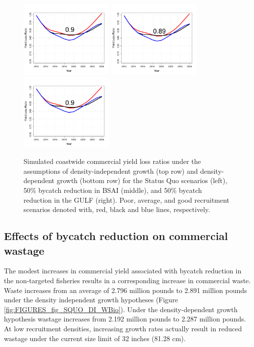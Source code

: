 \begin{figure}[htbp]
		\includegraphics[height=1.5in]{../FIGURES/YLR/fig_SQUO_DD_ylr.pdf}
		\includegraphics[height=1.5in]{../FIGURES/YLR/fig_BSAI_DD_ylr.pdf}
		\includegraphics[height=1.5in]{../FIGURES/YLR/fig_GULF_DD_ylr.pdf}		
	\caption{Simulated coastwide commercial yield loss ratios under the assumptions of density-independent growth (top row) and density-dependent growth (bottom row) for the Status Quo scenarios (left), 50\% bycatch reduction in BSAI (middle), and 50\% bycatch reduction in the GULF (right).  Poor, average, and good recruitment scenarios denoted with, red, black and blue lines, respectively.}
	\label{fig:FIGURES_YLR_fig_SQUO_DI_ylr}
\end{figure}

\subsection{Effects of bycatch reduction on commercial wastage} %
\label{sub:effects_of_bycatch_reduction_on_commercial_wastage}

The modest increases in commercial yield associated with bycatch reduction in the non-targeted fisheries results in a corresponding increase in commercial waste.  Waste increases from an average of 2.796 million pounds to 2.891 million pounds under the density independent growth hypotheses (Figure \ref{fig:FIGURES_fig_SQUO_DI_WBio}).  Under the density-dependent growth hypothesis wastage increases from 2.192 million pounds to 2.287 million pounds.  At low recruitment densities, increasing growth rates actually result in reduced wastage under the current size limit of 32 inches (81.28 cm).

